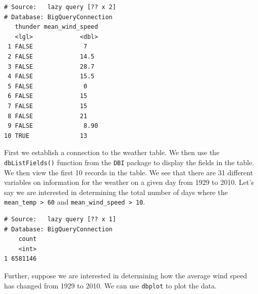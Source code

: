 \documentclass[]{krantz}
\makeatletter
\newenvironment{Shaded}{\begin{snugshade}}{\end{snugshade}}
\newcommand{\KeywordTok}[1]{\textcolor[rgb]{0.27,0.27,0.27}{\textbf{#1}}}
\newcommand{\DataTypeTok}[1]{\textcolor[rgb]{0.27,0.27,0.27}{#1}}
\newcommand{\DecValTok}[1]{\textcolor[rgb]{0.06,0.06,0.06}{#1}}
\newcommand{\StringTok}[1]{\textcolor[rgb]{0.5,0.5,0.5}{#1}}
\newcommand{\OtherTok}[1]{\textcolor[rgb]{0.37,0.37,0.37}{#1}}
\newcommand{\OperatorTok}[1]{\textcolor[rgb]{0.43,0.43,0.43}{\textbf{#1}}}
\newcommand{\NormalTok}[1]{#1}
\newenvironment{kframe}{%
\medskip{}
\setlength{\fboxsep}{.8em}
 \def\at@end@of@kframe{}%
 \ifinner\ifhmode%
  \def\at@end@of@kframe{\end{minipage}}%
  \begin{minipage}{\columnwidth}%
 \fi\fi%
 \def\FrameCommand##1{\hskip\@totalleftmargin \hskip-\fboxsep
 \colorbox{shadecolor}{##1}\hskip-\fboxsep
     \hskip-\linewidth \hskip-\@totalleftmargin \hskip\columnwidth}%
 \MakeFramed {\advance\hsize-\width
   \@totalleftmargin\z@ \linewidth\hsize
   \@setminipage}}%
 {\par\unskip\endMakeFramed%
 \at@end@of@kframe}
\renewenvironment{Shaded}{\begin{kframe}}{\end{kframe}}
\makeatother
\begin{document}
\begin{verbatim}
# Source:   lazy query [?? x 2]
# Database: BigQueryConnection
   thunder mean_wind_speed
   <lgl>             <dbl>
 1 FALSE              7   
 2 FALSE             14.5 
 3 FALSE             28.7 
 4 FALSE             15.5 
 5 FALSE              0   
 6 FALSE             15   
 7 FALSE             15   
 8 FALSE             21   
 9 FALSE              8.90
10 TRUE              13   
\end{verbatim}

First we establish a connection to the weather table. We then use the
\texttt{dbListFields()} function from the \texttt{DBI} package to
display the fields in the table. We then view the first 10 records in
the table. We see that there are 31 different variables on information
for the weather on a given day from 1929 to 2010. Let's say we are
interested in determining the total number of days where the
\texttt{mean\_temp\ \textgreater{}\ 60} and
\texttt{mean\_wind\_speed\ \textgreater{}\ 10}.

\begin{Shaded}
\end{Shaded}

\begin{verbatim}
# Source:   lazy query [?? x 1]
# Database: BigQueryConnection
    count
    <int>
1 6581146
\end{verbatim}

Further, suppose we are interested in determining how the average wind
speed has changed from 1929 to 2010. We can use \texttt{dbplot} to plot
the data.

\begin{Shaded}
\end{Shaded}
\end{document}

